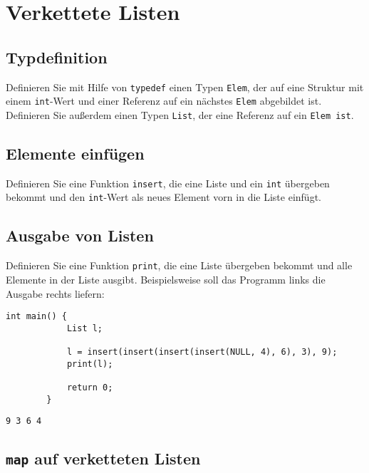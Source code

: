 \documentclass[a4paper]{article}
\begin{document}
	\section{Verkettete Listen}
	
	\subsection{Typdefinition}
	
	Definieren Sie mit Hilfe von \texttt{typedef} einen Typen \texttt{Elem}, der auf eine Struktur mit einem \texttt{int}-Wert und einer Referenz auf ein nächstes \texttt{Elem} abgebildet ist.
	Definieren Sie außerdem einen Typen \texttt{List}, der eine Referenz auf ein \texttt{Elem ist}.
	
	\subsection{Elemente einfügen}
	
	Definieren Sie eine Funktion \texttt{insert}, die eine Liste und ein \texttt{int} übergeben bekommt und den \texttt{int}-Wert als neues Element vorn in die Liste einfügt.
	
	\subsection{Ausgabe von Listen}
	
	Definieren Sie eine Funktion \texttt{print}, die eine Liste übergeben bekommt und alle Elemente in der Liste ausgibt.
	Beispielsweise soll das Programm links die Ausgabe rechts liefern:
	
	\noindent\begin{minipage}[t][][b]{0.7\linewidth}
	\begin{lstlisting}[gobble=4]
		int main() {
			List l;
			
			l = insert(insert(insert(insert(NULL, 4), 6), 3), 9);
			print(l);
			
			return 0;
		}
	\end{lstlisting}
	\end{minipage}\qquad
	\begin{minipage}[t][][b]{0.2\linewidth}
	\begin{lstlisting}[gobble=4]
		9 3 6 4
	\end{lstlisting}
	\end{minipage}
	
	\subsection{\texttt{map} auf verketteten Listen}
	
\end{document}

